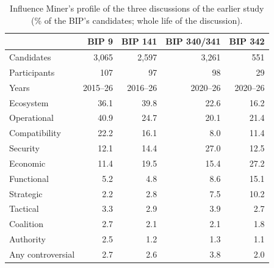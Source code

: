 \documentclass[sigconf,screen]{acmart}
\begin{document}
\begin{table}[t]
\caption{Influence Miner's profile of the three discussions of the earlier study (\% of the BIP's candidates; whole life of the discussion).}
\label{tab:icisbips}
\footnotesize
\setlength{\tabcolsep}{3.5pt}
\begin{tabular}{lrrrr}
\toprule
 & BIP 9 & BIP 141 & BIP 340/341 & BIP 342 \\
\midrule
Candidates & 3,065 & 2,597 & 3,261 & 551 \\
Participants & 107 & 97 & 98 & 29 \\
Years & 2015--26 & 2016--26 & 2020--26 & 2020--26 \\
\midrule
Ecosystem & 36.1 & 39.8 & 22.6 & 16.2 \\
Operational & 40.9 & 24.7 & 20.1 & 21.4 \\
Compatibility & 22.2 & 16.1 & 8.0 & 11.4 \\
Security & 12.1 & 14.4 & 27.0 & 12.5 \\
Economic & 11.4 & 19.5 & 15.4 & 27.2 \\
Functional & 5.2 & 4.8 & 8.6 & 15.1 \\
Strategic & 2.2 & 2.8 & 7.5 & 10.2 \\
Tactical & 3.3 & 2.9 & 3.9 & 2.7 \\
Coalition & 2.7 & 2.1 & 2.1 & 1.8 \\
Authority & 2.5 & 1.2 & 1.3 & 1.1 \\
Any controversial & 2.7 & 2.6 & 3.8 & 2.0 \\
\bottomrule
\end{tabular}
\end{table}
\end{document}
